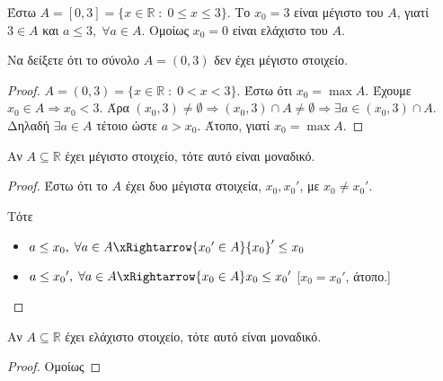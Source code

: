 \documentclass[main.tex]{subfiles}
\begin{document}
\begin{example}
    Έστω $ A = [0,3] = \{ x \in \mathbb{R} \; : \; 0 \leq x \leq 3 \} $. 
    Το $ x_{0}= 3 $ είναι μέγιστο του $A$, γιατί $ 3 \in A $ και 
    $ a \leq 3, \; \forall a \in A $. Ομοίως $ x_{0}= 0 $ είναι ελάχιστο 
    του $A$.
\end{example}

\begin{example}
    Να δείξετε ότι το σύνολο $ A = (0,3) $ δεν έχει μέγιστο στοιχείο.
\end{example}

\begin{proof}
\item {}
    $ A = (0,3) = \{ x \in \mathbb{R} \; : \; 0 < x < 3 \} $. 
    Έστω ότι $ x_{0} = \max A $. Έχουμε  $ x_{0} \in A \Rightarrow  x_{0} 
    < 3$. Άρα  $ (x_{0}, 3) \neq \emptyset \Rightarrow (x_{0},3) \cap A \neq 
    \emptyset \Rightarrow \exists a \in (x_{0},3) \cap A $. Δηλαδή $ 
    \exists a \in A$ τέτοιο ώστε $ a > x_{0} $. Άτοπο, γιατί $ x_{0}= \max A $.
\end{proof}

\pagebreak

\begin{prop}
    Αν $ A \subseteq \mathbb{R} $ έχει μέγιστο στοιχείο, τότε αυτό είναι 
    μοναδικό.
\end{prop}


\begin{proof}
    Έστω ότι το $A$ έχει δυο μέγιστα στοιχεία,  $ x_{0}, {x_{0}}' $,  με 
    $ x_{0} \neq {x_{0}}'$. 

    Τότε 
    \begin{itemize}
        \item $ a \leq x_{0}, \; \forall a \in A \xRightarrow{{x_{0}}' 
            \in A } {x_{0}}'  \leq x_{0} $ 
        \item $ a \leq {x_{0}}', \; \forall a \in A \xRightarrow{x_{0} 
            \in A } x_{0} \leq {x_{0}}' $ 
            [$ x_{0} = {x_{0}}' $, άτοπο.] 
    \end{itemize}
\end{proof}

\begin{prop}
    Αν $ A \subseteq \mathbb{R} $ έχει ελάχιστο στοιχείο, τότε αυτό είναι 
    μοναδικό.
\end{prop}

\begin{proof}
    Ομοίως 
\end{proof}
\end{document}
